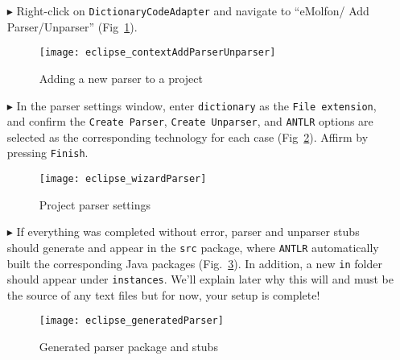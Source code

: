 \begin{itemize}

\item[$\blacktriangleright$] Right-click on \texttt{DictionaryCodeAdapter} and navigate to ``eMolfon/ Add Parser/Unparser''
(Fig~\ref{eclipse:contextParser}).

\vspace{0.5cm}

\begin{figure}[htpb]
\begin{center}
  \texttt{[image: eclipse\_contextAddParserUnparser]}
  \caption{Adding a new parser to a project}
  \label{eclipse:contextParser}
\end{center}
\end{figure}


\item[$\blacktriangleright$] In the parser settings window, enter \texttt{dictionary} as the \texttt{File extension}, and confirm the \texttt{Create Parser},
\texttt{Create Unparser}, and \texttt{ANTLR} options are selected as the corresponding technology for each case (Fig~\ref{eclipse:wizardParser}). Affirm by
pressing \texttt{Finish}.

\begin{figure}[htpb]
\begin{center}
  \texttt{[image: eclipse\_wizardParser]}
  \caption{Project parser settings}
  \label{eclipse:wizardParser}
\end{center}
\end{figure}

\vspace{0.5cm}

\item[$\blacktriangleright$] If everything was completed without error, parser and unparser stubs should generate and appear in the \texttt{src}
package, where \texttt{ANTLR} automatically built the corresponding Java packages (Fig.~\ref{eclipse:generatedParser}). In addition, a new
\texttt{in} folder should appear under \texttt{instances}. We'll explain later why this will and  must be the source of any text files but for now, your setup
is complete!

\begin{figure}[htpb]
\begin{center}
  \texttt{[image: eclipse\_generatedParser]}
  \caption{Generated parser package and stubs}
  \label{eclipse:generatedParser}
\end{center}
\end{figure}

\end{itemize}

